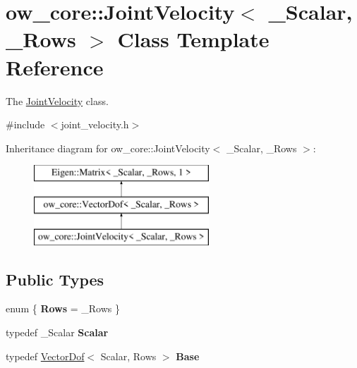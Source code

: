 \hypertarget{classow__core_1_1JointVelocity}{}\section{ow\+\_\+core\+:\+:Joint\+Velocity$<$ \+\_\+\+Scalar, \+\_\+\+Rows $>$ Class Template Reference}
\label{classow__core_1_1JointVelocity}


The \hyperlink{classow__core_1_1JointVelocity}{Joint\+Velocity} class.  




{\ttfamily \#include $<$joint\+\_\+velocity.\+h$>$}

Inheritance diagram for ow\+\_\+core\+:\+:Joint\+Velocity$<$ \+\_\+\+Scalar, \+\_\+\+Rows $>$\+:\begin{figure}[H]
\begin{center}
\leavevmode
\includegraphics[height=3.000000cm]{da/d5f/classow__core_1_1JointVelocity}
\end{center}
\end{figure}
\subsection*{Public Types}
\begin{DoxyCompactItemize}
\item 
enum \{ {\bfseries Rows} = \+\_\+\+Rows
 \}\hypertarget{classow__core_1_1JointVelocity_a75add96357b65cd35fa5edf5275439b7}{}\label{classow__core_1_1JointVelocity_a75add96357b65cd35fa5edf5275439b7}

\item 
typedef \+\_\+\+Scalar {\bfseries Scalar}\hypertarget{classow__core_1_1JointVelocity_a4e972bf4b9e3204bd9074f3f22f9bef2}{}\label{classow__core_1_1JointVelocity_a4e972bf4b9e3204bd9074f3f22f9bef2}

\item 
typedef \hyperlink{classow__core_1_1VectorDof}{Vector\+Dof}$<$ Scalar, Rows $>$ {\bfseries Base}\hypertarget{classow__core_1_1JointVelocity_a85aa20acbd125d605c5e54dc7505e3cd}{}\label{classow__core_1_1JointVelocity_a85aa20acbd125d605c5e54dc7505e3cd}

\end{DoxyCompactItemize}
